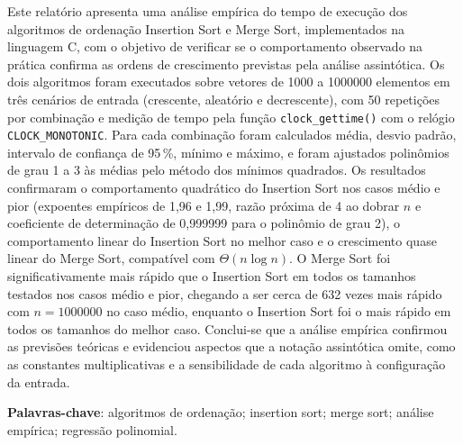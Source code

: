 \documentclass[
    12pt,
    oneside,
    a4paper,
    openany,
    chapter=TITLE,
    english,
    brazil
]{abntex2}
\begin{document}
\frenchspacing

\pretextual

\imprimircapa
\imprimirfolhaderosto

\setlength{\absparsep}{18pt}
\begin{resumo}
Este relatório apresenta uma análise empírica do tempo de execução dos algoritmos de ordenação Insertion Sort e Merge Sort, implementados na linguagem C, com o objetivo de verificar se o comportamento observado na prática confirma as ordens de crescimento previstas pela análise assintótica. Os dois algoritmos foram executados sobre vetores de \num{1000} a \num{1000000} elementos em três cenários de entrada (crescente, aleatório e decrescente), com 50 repetições por combinação e medição de tempo pela função \texttt{clock\_gettime()} com o relógio \texttt{CLOCK\_MONOTONIC}. Para cada combinação foram calculados média, desvio padrão, intervalo de confiança de 95\,\%, mínimo e máximo, e foram ajustados polinômios de grau 1 a 3 às médias pelo método dos mínimos quadrados. Os resultados confirmaram o comportamento quadrático do Insertion Sort nos casos médio e pior (expoentes empíricos de 1,96 e 1,99, razão próxima de 4 ao dobrar $n$ e coeficiente de determinação de 0,999999 para o polinômio de grau 2), o comportamento linear do Insertion Sort no melhor caso e o crescimento quase linear do Merge Sort, compatível com $\Theta(n \log n)$. O Merge Sort foi significativamente mais rápido que o Insertion Sort em todos os tamanhos testados nos casos médio e pior, chegando a ser cerca de 632 vezes mais rápido com $n = \num{1000000}$ no caso médio, enquanto o Insertion Sort foi o mais rápido em todos os tamanhos do melhor caso. Conclui-se que a análise empírica confirmou as previsões teóricas e evidenciou aspectos que a notação assintótica omite, como as constantes multiplicativas e a sensibilidade de cada algoritmo à configuração da entrada.

\textbf{Palavras-chave}: algoritmos de ordenação; insertion sort; merge sort; análise empírica; regressão polinomial.
\end{resumo}

\listoffigures*
\cleardoublepage

\listoftables*
\cleardoublepage

\tableofcontents*
\cleardoublepage

\textual
\end{document}
